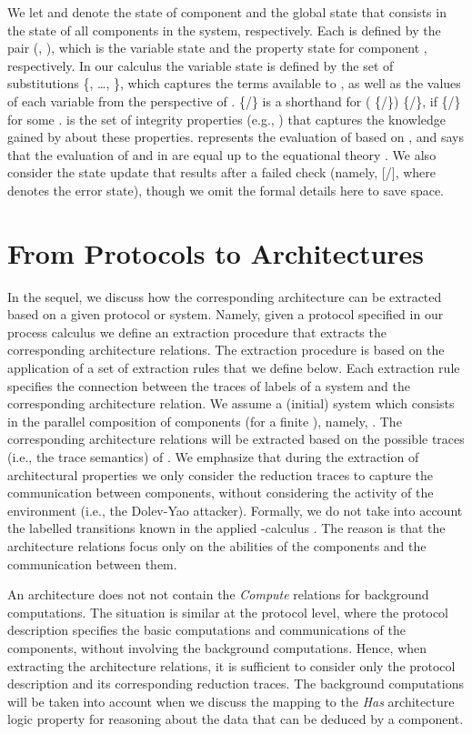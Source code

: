 \documentclass{llncs}
\begin{document}
We let  and  denote the state of component  and   
the global state that consists in the state of all components in the system, respectively.  
Each  is defined by the pair (, ), which is the 
variable state and the property state for component , respectively. In our calculus 
the variable state  is defined by the set of substitutions \{, 
\dots, \}, which captures the terms available to , as well as the values of each 
variable from the perspective of . \{/\} is a shorthand for 
(  \{/\})  \{/\}, if \{/\}  
 for some .  is the set of integrity properties (e.g.,   ) 
that captures the knowledge gained by  about these properties.  
 represents the evaluation of  based on , and 
     says that the evaluation of 
 and  in  are equal up to the equational theory .  
We also consider the state update that results after a failed check 
(namely, [/], where  denotes the error state), 
though we omit the formal details here to save space.  

\section{From Protocols to Architectures}
\label{sec:extrarch}   
In the sequel, we discuss how the corresponding architecture can be extracted based on a given protocol or system. 
Namely, given a protocol specified in our process calculus we define an extraction procedure that extracts 
the corresponding architecture relations. The extraction procedure is based on the application of a set of 
extraction rules that we define below. Each extraction rule specifies the connection between the traces of labels    
of a system and the corresponding architecture relation. We assume a (initial) system  which consists 
in the parallel composition of  components (for a finite ), namely,   . 
The corresponding architecture relations will be extracted based on the possible traces (i.e., the trace semantics) 
of . We emphasize that during the extraction of architectural properties we only consider the reduction traces to 
capture the communication between components, without considering the activity of the environment (i.e., the Dolev-Yao 
attacker). Formally, we do not take into account the labelled transitions known in the applied -calculus \cite{fournet01mobile}. The 
reason is that the architecture relations focus only on the abilities of the components and the communication 
between them.

An architecture does not not contain the \textit{Compute} relations for background computations. 
The situation is similar at the protocol level, where the protocol description specifies 
the basic computations and communications of the components, without involving the background computations. 
Hence, when extracting the architecture relations, it is sufficient to consider only the protocol description and its
corresponding reduction traces. The background computations will be taken into account when we discuss the 
mapping to the \textit{Has} architecture logic property for reasoning about the data that 
can be deduced by a component. 
\end{document}
